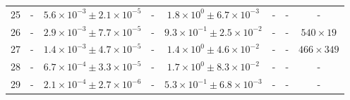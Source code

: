 \begin{table}
\begin{tabular}{cccccccc}
25 & - & $5.6\times10^{-3}\pm 2.1\times10^{-5}$ & - & $1.8\times10^{0}\pm 6.7\times10^{-3}$ & - & - & - \\
26 & - & $2.9\times10^{-3}\pm 7.7\times10^{-5}$ & - & $9.3\times10^{-1}\pm 2.5\times10^{-2}$ & - & - & $540\times 19$ \\
27 & - & $1.4\times10^{-3}\pm 4.7\times10^{-5}$ & - & $1.4\times10^{0}\pm 4.6\times10^{-2}$ & - & - & $466\times 349$ \\
28 & - & $6.7\times10^{-4}\pm 3.3\times10^{-5}$ & - & $1.7\times10^{0}\pm 8.3\times10^{-2}$ & - & - & - \\
29 & - & $2.1\times10^{-4}\pm 2.7\times10^{-6}$ & - & $5.3\times10^{-1}\pm 6.8\times10^{-3}$ & - & - & - \\
\end{tabular}
\end{table}
